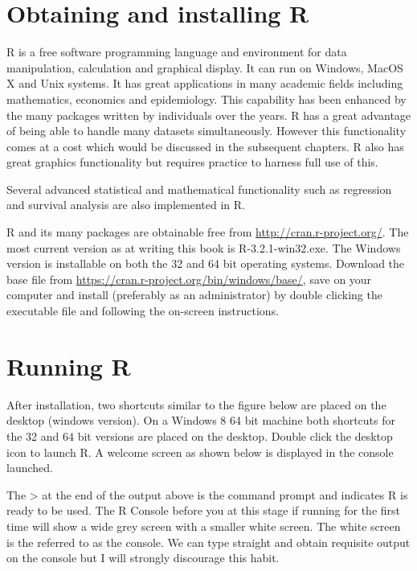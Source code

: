 \documentclass[
]{book}
\theoremstyle{definition}
\theoremstyle{definition}
\theoremstyle{definition}
\theoremstyle{definition}
\theoremstyle{remark}
\begin{document}
\hypertarget{obtaining-and-installing-r}{%
\section{Obtaining and installing R}\label{obtaining-and-installing-r}}

R is a free software programming language and environment for data manipulation, calculation and graphical display. It can run on Windows, MacOS X and Unix systems. It has great applications in many academic fields including mathematics, economics and epidemiology. This capability has been enhanced by the many packages written by individuals over the years. R has a great advantage of being able to handle many datasets simultaneously. However this functionality comes at a cost which would be discussed in the subsequent chapters. R also has great graphics functionality but requires practice to harness full use of this.

Several advanced statistical and mathematical functionality such as regression
and survival analysis are also implemented in R.

R and its many packages are obtainable free from \url{http://cran.r-project.org/}.
The most current version as at writing this book is R-3.2.1-win32.exe. The
Windows version is installable on both the 32 and 64 bit operating systems.
Download the base file from \url{https://cran.r-project.org/bin/windows/base/}, save on your computer and install (preferably as an administrator) by double clicking the executable file and following the on-screen instructions.

\hypertarget{running-r}{%
\section{Running R}\label{running-r}}

After installation, two shortcuts similar to the figure below are placed on the desktop (windows version). On a Windows 8 64 bit machine both shortcuts for the 32 and 64 bit versions are placed on the desktop. Double click the desktop icon to launch R. A welcome screen as shown below is displayed in the console launched.

The \textgreater{} at the end of the output above is the command prompt and indicates R is
ready to be used. The R Console before you at this stage if running for the
first time will show a wide grey screen with a smaller white screen. The white
screen is the referred to as the console. We can type straight and obtain
requisite output on the console but I will strongly discourage this habit.
\end{document}
